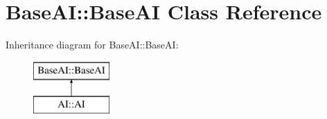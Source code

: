 \hypertarget{classBaseAI_1_1BaseAI}{
\section{BaseAI::BaseAI Class Reference}
\label{classBaseAI_1_1BaseAI}
}
Inheritance diagram for BaseAI::BaseAI:\begin{figure}[H]
\begin{center}
\leavevmode
\includegraphics[height=2cm]{classBaseAI_1_1BaseAI}
\end{center}
\end{figure}
